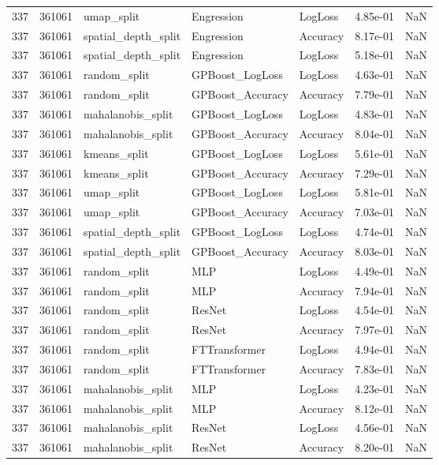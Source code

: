 \begin{tabular}{rrlllrr}
337 & 361061 & umap\_split & Engression & LogLoss & 4.85e-01 & NaN \\
337 & 361061 & spatial\_depth\_split & Engression & Accuracy & 8.17e-01 & NaN \\
337 & 361061 & spatial\_depth\_split & Engression & LogLoss & 5.18e-01 & NaN \\
337 & 361061 & random\_split & GPBoost\_LogLoss & LogLoss & 4.63e-01 & NaN \\
337 & 361061 & random\_split & GPBoost\_Accuracy & Accuracy & 7.79e-01 & NaN \\
337 & 361061 & mahalanobis\_split & GPBoost\_LogLoss & LogLoss & 4.83e-01 & NaN \\
337 & 361061 & mahalanobis\_split & GPBoost\_Accuracy & Accuracy & 8.04e-01 & NaN \\
337 & 361061 & kmeans\_split & GPBoost\_LogLoss & LogLoss & 5.61e-01 & NaN \\
337 & 361061 & kmeans\_split & GPBoost\_Accuracy & Accuracy & 7.29e-01 & NaN \\
337 & 361061 & umap\_split & GPBoost\_LogLoss & LogLoss & 5.81e-01 & NaN \\
337 & 361061 & umap\_split & GPBoost\_Accuracy & Accuracy & 7.03e-01 & NaN \\
337 & 361061 & spatial\_depth\_split & GPBoost\_LogLoss & LogLoss & 4.74e-01 & NaN \\
337 & 361061 & spatial\_depth\_split & GPBoost\_Accuracy & Accuracy & 8.03e-01 & NaN \\
337 & 361061 & random\_split & MLP & LogLoss & 4.49e-01 & NaN \\
337 & 361061 & random\_split & MLP & Accuracy & 7.94e-01 & NaN \\
337 & 361061 & random\_split & ResNet & LogLoss & 4.54e-01 & NaN \\
337 & 361061 & random\_split & ResNet & Accuracy & 7.97e-01 & NaN \\
337 & 361061 & random\_split & FTTransformer & LogLoss & 4.94e-01 & NaN \\
337 & 361061 & random\_split & FTTransformer & Accuracy & 7.83e-01 & NaN \\
337 & 361061 & mahalanobis\_split & MLP & LogLoss & 4.23e-01 & NaN \\
337 & 361061 & mahalanobis\_split & MLP & Accuracy & 8.12e-01 & NaN \\
337 & 361061 & mahalanobis\_split & ResNet & LogLoss & 4.56e-01 & NaN \\
337 & 361061 & mahalanobis\_split & ResNet & Accuracy & 8.20e-01 & NaN \\

\end{tabular}
